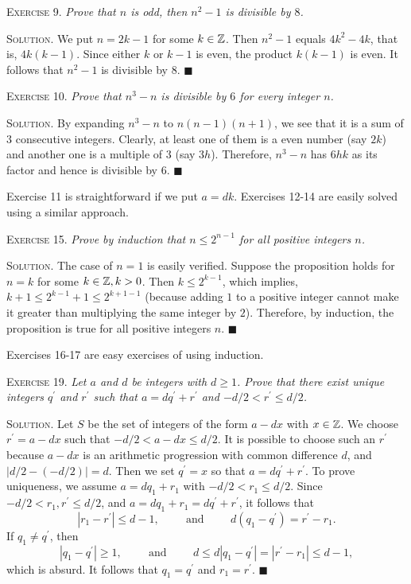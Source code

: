 \documentclass[11pt, leqno]{article}
\newcommand{\done}{\ensuremath{\blacksquare}}
\begin{document}
\textsc{Exercise 9}. \emph{Prove that $n$ is odd, then $n^2-1$ is divisible by $8$.}

\textsc{Solution}. We put $n=2k-1$ for some $k\in\mathbb{Z}$. Then $n^2-1$ equals $4k^2-4k$, that is, $4k(k-1)$. Since either $k$ or $k-1$ is even, the product $k(k-1)$ is even. It follows that $n^2-1$ is divisible by $8$. \done

\textsc{Exercise 10}. \emph{Prove that $n^3-n$ is divisible by $6$ for every integer $n$.}

\textsc{Solution}. By expanding $n^3-n$ to $n(n-1)(n+1)$, we see that it is a sum of $3$ consecutive integers. Clearly, at least one of them is a even number (say $2k$) and another one is a multiple of $3$ (say $3h$). Therefore, $n^3-n$ has $6hk$ as its factor and hence is divisible by $6$. \done

Exercise 11 is straightforward if we put $a=dk$. Exercises 12-14 are easily solved using a similar approach. 

\textsc{Exercise 15}. \emph{Prove by induction that $n\leq 2^{n-1}$ for all positive integers $n$.}

\textsc{Solution}. The case of $n=1$ is easily verified. Suppose the proposition holds for $n=k$ for some $k\in\mathbb{Z}, k>0$. Then $k \leq 2^{k-1}$, which implies, $k+1 \leq 2^{k-1}+1 \leq 2^{k+1-1}$ (because adding $1$ to a positive integer cannot make it greater than multiplying the same integer by $2$). Therefore, by induction, the proposition is true for all positive integers $n$. \done

Exercises 16-17 are easy exercises of using induction.

\textsc{Exercise 19}. \emph{Let $a$ and $d$ be integers with $d\geq 1$. Prove that there exist unique integers $q^{\prime}$ and $r^{\prime}$ such that $a=dq^{\prime} + r^{\prime}$ and $-d/2 < r^{\prime} \leq d/2$.}

\textsc{Solution}. Let $S$ be the set of integers of the form $a-dx$ with $x\in\mathbb{Z}$. We choose $r^{\prime} = a-dx$ such that $-d/2 < a-dx \leq d/2$. It is possible to choose such an $r^{\prime}$ because $a-dx$ is an arithmetic progression with common difference $d$, and $|d/2 - (-d/2)| = d$. Then we set $q^{\prime} = x$ so that $a = dq^{\prime} + r^{\prime}$. To prove uniqueness, we assume $a = dq_1 + r_1$ with $-d/2 < r_1 \leq d/2$. Since $-d/2 < r_1, r^{\prime} \leq d/2$, and $a = dq_1+r_1 = dq^{\prime} + r^{\prime}$, it follows that 
\begin{displaymath}
|r_1 - r^{\prime}| \leq d-1, \hspace{1cm} \text{and} \hspace{1cm} d(q_1-q^{\prime}) = r^{\prime} - r_1.
\end{displaymath}
If $q_1 \ne q^{\prime}$, then 
\begin{displaymath}
|q_1 - q^{\prime}| \geq 1, \hspace{1cm} \text{and} \hspace{1cm} d\leq d|q_1-q^{\prime}| = |r^{\prime} - r_1 | \leq d-1,
\end{displaymath}
which is absurd. It follows that $q_1 = q^{\prime}$ and $r_1 = r^{\prime}$. \done
\end{document}
